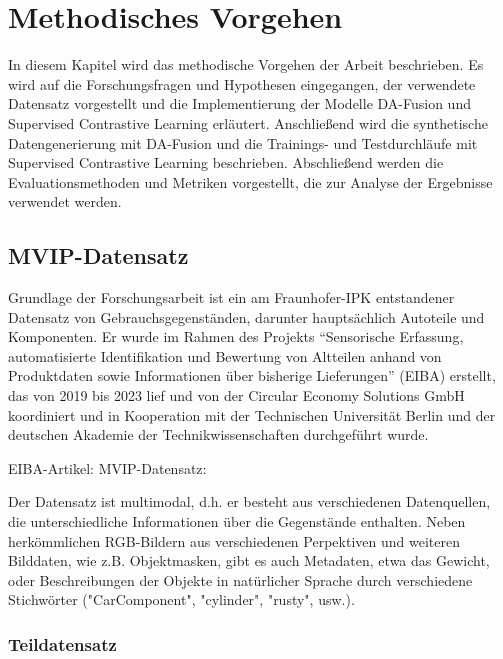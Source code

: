 \chapter{Methodisches Vorgehen}

In diesem Kapitel wird das methodische Vorgehen der Arbeit beschrieben. Es wird auf die Forschungsfragen und Hypothesen eingegangen, der verwendete Datensatz vorgestellt und die Implementierung der Modelle DA-Fusion und Supervised Contrastive Learning erläutert. Anschließend wird die synthetische Datengenerierung mit DA-Fusion und die Trainings- und Testdurchläufe mit Supervised Contrastive Learning beschrieben. Abschließend werden die Evaluationsmethoden und Metriken vorgestellt, die zur Analyse der Ergebnisse verwendet werden.

\section{MVIP-Datensatz} \label{sec:dataset}

Grundlage der Forschungsarbeit ist ein am Fraunhofer-IPK entstandener Datensatz von Gebrauchsgegenständen, darunter hauptsächlich Autoteile und Komponenten. Er wurde im Rahmen des Projekts “Sensorische Erfassung, automatisierte Identifikation und Bewertung von Altteilen anhand von Produktdaten sowie Informationen über bisherige Lieferungen” (EIBA) erstellt, das von 2019 bis 2023 lief und von der Circular Economy Solutions GmbH koordiniert und in Kooperation mit der Technischen Universität Berlin und der deutschen Akademie der Technikwissenschaften durchgeführt wurde.

EIBA-Artikel: \parencite{ReziProK2019eiba}
MVIP-Datensatz: \parencite{Koch2023mvip}

Der Datensatz ist multimodal, d.h. er besteht aus verschiedenen Datenquellen, die unterschiedliche Informationen über die Gegenstände enthalten. Neben herkömmlichen RGB-Bildern aus verschiedenen Perpektiven und weiteren Bilddaten, wie z.B. Objektmasken, gibt es auch Metadaten, etwa das Gewicht, oder Beschreibungen der Objekte in natürlicher Sprache durch verschiedene Stichwörter ("CarComponent", "cylinder", "rusty", usw.).



\subsection{Teildatensatz} \label{sec:subdataset}

